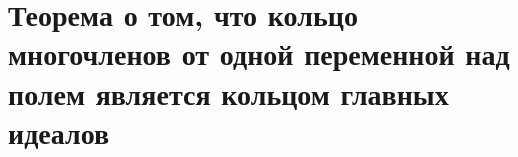 \section{Теорема о том, что кольцо многочленов от одной переменной над полем является кольцом главных идеалов}